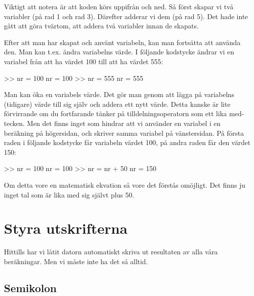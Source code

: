 Viktigt att notera är att koden körs uppifrån och ned. Så först skapar vi två variabler (på rad 1 och rad 3). Därefter adderar vi dem (på rad 5). Det hade inte gått att göra tvärtom, att addera två variabler innan de skapats.

Efter att man har skapat och använt variabeln, kan man fortsätta att använda den. Man kan t.ex. ändra variabelns värde. I följande kodstycke ändrar vi en variabel från att ha värdet 100 till att ha värdet 555:

\begin{matlab}[caption={Ändra värdet på en variabel},label={}]
>> nr = 100
nr =  100
>> nr = 555
nr =  555
\end{matlab}


Man kan öka en variabels värde. Det gör man genom att lägga på variabelns (tidigare) värde till sig själv och addera ett nytt värde. Detta kanske är lite förvirrande om du fortfarande tänker på tilldelningsoperatorn som ett lika med-tecken. Men det finns inget som hindrar att vi använder en variabel i en beräkning på högersidan, och skriver samma variabel på vänstersidan. På första raden i följande kodstycke får variabeln  värdet 100, på andra raden får den värdet 150:

\begin{matlab}[caption={Öka värdet på variabeln},label={}]
>> nr = 100
nr =  100
>> nr = nr + 50
nr =  150
\end{matlab}

Om detta vore en matematisk ekvation så vore det förstås omöjligt. Det finns ju inget tal som är lika med sig självt plus 50.


\section{Styra utskrifterna}

Hittills har vi låtit datorn automatiskt skriva ut resultaten av alla våra beräkningar. Men vi måste inte ha det så alltid.

\subsection{Semikolon}

